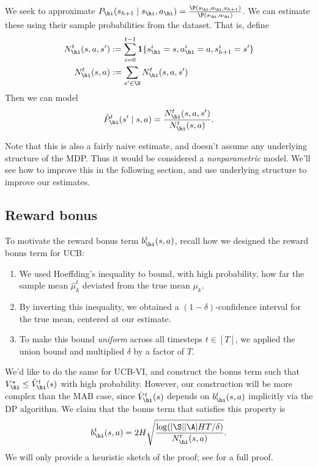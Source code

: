 \documentclass[\main/main]{subfiles}
\begin{document}
We seek to approximate $P_\hi(s_{h+1} \mid s_\hi, a_\hi) = \frac{\P(s_\hi, a_\hi, s_{h+1})}{\P(s_\hi, a_\hi)}$. We can estimate these using their sample probabilities from the dataset. That is, define
\begin{align*}
    N_\hi^t(s, a, s') &:= \sum_{i=0}^{t-1} \mathbf{1}\{ s_\hi^i = s, a_\hi^i = a, s_{h+1}^i = s' \} \\
    N_\hi^t(s, a) &:= \sum_{s' \in \S} N_\hi^t(s, a, s') \\
\end{align*}
Then we can model
\[
    \hat{P}_\hi^t(s' \mid s, a) = \frac{N_\hi^t(s, a, s')}{N_\hi^t(s, a)}.
\]
\begin{remark}
Note that this is also a fairly naive estimate, and doesn't assume any underlying structure of the MDP. Thus it would be considered a \emph{nonparametric} model. We'll see how to improve this in the following section, and use underlying structure to improve our estimates.
\end{remark}

\subsection{Reward bonus}

To motivate the reward bonus term $b_\hi^t(s, a)$, recall how we designed the reward bonus term for UCB:
\begin{enumerate}
    \item  We used Hoeffding's inequality to bound, with high probability, how far the sample mean $\hat \mu_k^t$ deviated from the true mean $\mu_k$.
    \item By inverting this inequality, we obtained a $(1-\delta)$-confidence interval for the true mean,
    centered at our estimate.
    \item To make this bound \emph{uniform} across all timesteps $t \in [T]$,
    we applied the union bound and multiplied $\delta$ by a factor of $T$.
\end{enumerate}

We'd like to do the same for UCB-VI, and construct the bonus term such that $V_\hi^\star \le \hat{V}_\hi^t(s)$ with high probability.
However, our construction will be more complex than the MAB case, since $\hat{V}_\hi^t(s)$ depends on $b_\hi^t(s, a)$ implicitly via the DP algorithm.
We claim that the bonus term that satisfies this property is
\[
    b_\hi^t(s, a) = 2 H \sqrt{\frac{\log( |\S||\A|H T/\delta )}{N_\hi^t(s, a)}}.
\]
We will only provide a heuristic sketch of the proof; see \cite[Section 7.3]{agarwal_reinforcement_2022} for a full proof.
\end{document}
